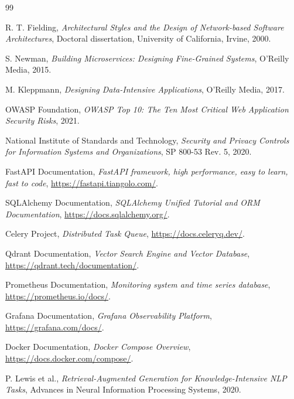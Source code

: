\documentclass[12pt,a4paper,oneside]{report}
\begin{document}
\begin{thebibliography}{99}

R. T. Fielding, \textit{Architectural Styles and the Design of Network-based Software Architectures}, Doctoral dissertation, University of California, Irvine, 2000.

S. Newman, \textit{Building Microservices: Designing Fine-Grained Systems}, O'Reilly Media, 2015.

M. Kleppmann, \textit{Designing Data-Intensive Applications}, O'Reilly Media, 2017.

OWASP Foundation, \textit{OWASP Top 10: The Ten Most Critical Web Application Security Risks}, 2021.

National Institute of Standards and Technology, \textit{Security and Privacy Controls for Information Systems and Organizations}, SP 800-53 Rev. 5, 2020.

FastAPI Documentation, \textit{FastAPI framework, high performance, easy to learn, fast to code}, \url{https://fastapi.tiangolo.com/}.

SQLAlchemy Documentation, \textit{SQLAlchemy Unified Tutorial and ORM Documentation}, \url{https://docs.sqlalchemy.org/}.

Celery Project, \textit{Distributed Task Queue}, \url{https://docs.celeryq.dev/}.

Qdrant Documentation, \textit{Vector Search Engine and Vector Database}, \url{https://qdrant.tech/documentation/}.

Prometheus Documentation, \textit{Monitoring system and time series database}, \url{https://prometheus.io/docs/}.

Grafana Documentation, \textit{Grafana Observability Platform}, \url{https://grafana.com/docs/}.

Docker Documentation, \textit{Docker Compose Overview}, \url{https://docs.docker.com/compose/}.

P. Lewis et al., \textit{Retrieval-Augmented Generation for Knowledge-Intensive NLP Tasks}, Advances in Neural Information Processing Systems, 2020.

\end{thebibliography}
\end{document}
